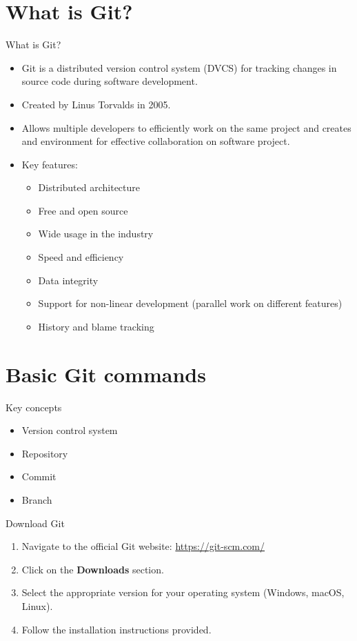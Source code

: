 \documentclass{beamer}
\begin{document}
\section{What is Git?}

\begin{frame}{What is Git?}
  \begin{itemize}
    \item Git is a distributed version control system (DVCS) for tracking changes in source code during software development.
    \item Created by Linus Torvalds in 2005.
    \item Allows multiple developers to efficiently work on the same project and creates and environment for effective collaboration on software project.
    \item Key features:
    \begin{itemize}
        \item Distributed architecture
        \item Free and open source
        \item Wide usage in the industry
        \item Speed and efficiency
        \item Data integrity
        \item Support for non-linear development (parallel work on different features)
        \item History and blame tracking
    \end{itemize}
  \end{itemize}
\end{frame}

\section{Basic Git commands}

\begin{frame}{Key concepts}
  \begin{itemize}
    \item Version control system
    \item Repository
    \item Commit
    \item Branch
  \end{itemize}
\end{frame}

\begin{frame}{Download Git}
  \begin{enumerate}
      \item Navigate to the official Git website: \url{https://git-scm.com/}
      \item Click on the \textbf{Downloads} section.
      \item Select the appropriate version for your operating system (Windows, macOS, Linux).
      \item Follow the installation instructions provided.
  \end{enumerate}
\end{frame}
\end{document}
